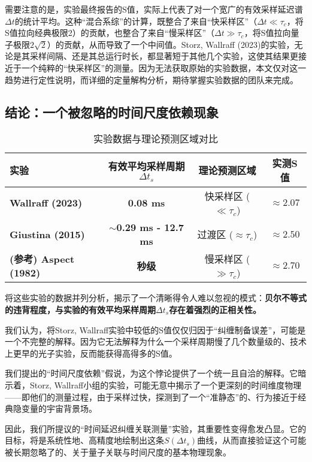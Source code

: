 \documentclass[12pt]{article}
\begin{document}
需要注意的是，实验最终报告的S值，实际上代表了对一个宽广的有效采样延迟谱$\Delta t$的统计平均。这种``混合系综''的计算，既整合了来自``快采样区''（$\Delta t \ll \tau_c$，将S值拉向经典极限2）的贡献，也整合了来自``慢采样区''（$\Delta t \gg \tau_c$，将S值拉向量子极限$2\sqrt{2}$）的贡献，从而导致了一个中间值。Storz, Wallraff (2023)的实验，无论是其采样间隔、还是其总运行时长，都显著短于其他几个实验，这使其结果更接近于一个纯粹的``快采样区''的测量。因为无法获取原始的实验数据，本文仅对这一趋势进行定性说明，而详细的定量解构分析，期待掌握实验数据的团队来完成。

\subsection{结论：一个被忽略的时间尺度依赖现象}

\begin{table}[h!]
\centering
\caption{实验数据与理论预测区域对比}
\label{tab:comparison}
\begin{tabular}{@{}lccc@{}}
\toprule
\textbf{实验} & \textbf{有效平均采样周期 $\Delta t_s$} & \textbf{理论预测区域} & \textbf{实测S值} \\
\midrule
\textbf{Wallraff (2023)} & \textbf{0.08 ms} & 快采样区 ($\ll \tau_c$) & \textbf{$\approx 2.07$} \\
\textbf{Giustina (2015)} & \textbf{$\sim$0.29 ms - 12.7 ms} & 过渡区 ($\approx \tau_c$) & \textbf{$\approx 2.50$} \\
\textbf{(参考) Aspect (1982)} & \textbf{秒级} & 慢采样区 ($\gg \tau_c$) & \textbf{$\approx 2.70$} \\
\bottomrule
\end{tabular}
\end{table}

将这些实验的数据并列分析，揭示了一个清晰得令人难以忽视的模式：\textbf{贝尔不等式的违背程度，与实验的有效平均采样周期$\Delta t_s$存在着强烈的正相关性。}

我们认为，将Storz, Wallraff实验中较低的S值仅仅归因于``纠缠制备误差''，可能是一个不完整的解释。因为它无法解释为什么一个采样周期慢了几个数量级的、技术上更早的光子实验，反而能获得高得多的S值。

我们提出的``时间尺度依赖''假说，为这个悖论提供了一个统一且自洽的解释。它暗示着，Storz, Wallraff小组的实验，可能无意中揭示了一个更深刻的时间维度物理——即他们的测量过程，由于采样过快，探测到了一个``准静态''的、行为接近于经典隐变量的宇宙背景场。

因此，我们所提议的``时间延迟纠缠关联测量''实验，其重要性变得愈发凸显。它的目标，将是系统性地、高精度地绘制出这条$S(\Delta t_s)$曲线，从而直接验证这个可能被长期忽略了的、关于量子关联与时间尺度的基本物理现象。
\end{document}
